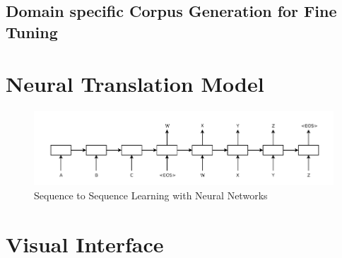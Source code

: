 \subsection{Domain specific Corpus Generation for Fine Tuning}


\section{Neural Translation Model}

\begin{figure}
\includegraphics[width=\textwidth]{figures/nmt1.png}
\caption{Sequence to Sequence Learning with Neural Networks} \label{fig1}
\end{figure}
\section{Visual Interface}